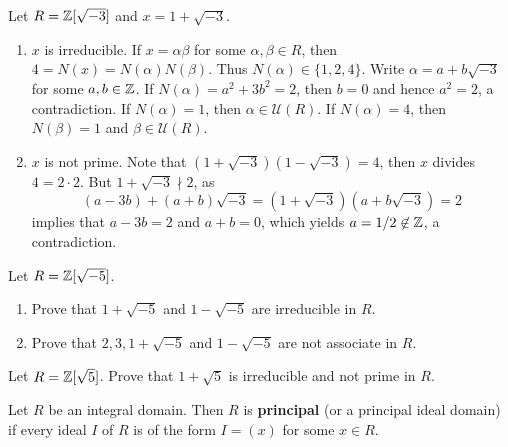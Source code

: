 \section{}

\begin{example}
	Let $R=\mathbb{Z}[\sqrt{-3}]$ and $x=1+\sqrt{-3}$. 
	\begin{enumerate}
		\item $x$ is irreducible. 
	If $x=\alpha\beta$ for some $\alpha,\beta\in R$, then 
	$4=N(x)=N(\alpha)N(\beta)$. Thus $N(\alpha)\in\{1,2,4\}$. 
	Write $\alpha=a+b\sqrt{-3}$ for some $a,b\in\mathbb{Z}$. 
	If $N(\alpha)=a^2+3b^2=2$, then $b=0$ and hence
	$a^2=2$, a contradiction. If $N(\alpha)=1$, then $\alpha\in\mathcal{U}(R)$.
	If $N(\alpha)=4$, then $N(\beta)=1$ and $\beta\in\mathcal{U}(R)$. 
%
%	
%	
		\item $x$ is not prime. Note that $(1+\sqrt{-3})(1-\sqrt{-3})=4$, then 
		$x$ divides $4=2\cdot 2$. But $1+\sqrt{-3}\nmid 2$, as 
		\[
		(a-3b)+(a+b)\sqrt{-3}=(1+\sqrt{-3})(a+b\sqrt{-3})=2
		\]
		implies that $a-3b=2$ and $a+b=0$, which yields 
		$a=1/2\not\in\mathbb{Z}$, a contradiction.
	\end{enumerate}
\end{example}

\begin{exercise}
	Let $R=\mathbb{Z}[\sqrt{-5}]$. 
	\begin{enumerate}
		\item Prove that $1+\sqrt{-5}$ and $1-\sqrt{-5}$ are irreducible in $R$. 
		\item Prove that $2,3,1+\sqrt{-5}$ and $1-\sqrt{-5}$ are not associate in $R$.
	\end{enumerate}
\end{exercise}

\begin{exercise}
	Let $R=\mathbb{Z}[\sqrt{5}]$. 
	Prove that $1+\sqrt{5}$ is irreducible and not prime in $R$. 	
\end{exercise}

\begin{definition}
	Let $R$ be an integral domain. Then $R$ is \textbf{principal} 
	(or a principal ideal domain) if
	every ideal $I$ of $R$ is of the form $I=(x)$ for some $x\in R$.   
\end{definition}

